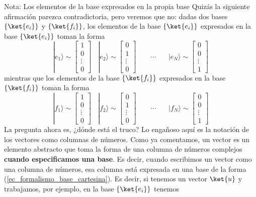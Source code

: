 \documentclass[a4paper,11pt]{book} %
\numberwithin{equation}{chapter}
\begin{document}
	\begin{mybox_blue}{Nota: Los elementos de la base expresados en la propia base}
	Quizás la siguiente afirmación parezca contradictoria, pero veremos que no: dadas dos bases $\{\ket{e_i}\}$ y $\{\ket{f_i}\}$, los elementos de la base $\{\ket{e_i}\}$ expresados en la base $\{\ket{e_i}\}$ toman la forma
		\begin{equation*}
|e_1\rangle \sim \begin{bmatrix} 1 \\ 0 \\ \vdots 
 \\ 0 \end{bmatrix}~~~~
|e_2\rangle \sim \begin{bmatrix} 0 \\ 1 \\  \vdots 
 \\ 0 \end{bmatrix}~~~~~~~~~
\cdots ~~~~~~~~
|e_N\rangle \sim \begin{bmatrix} 0 \\ 0 \\ \vdots 
 \\ 1 \end{bmatrix}
		\end{equation*}
	mientras que los elementos de la base $\{\ket{f_i}\}$ expresados en la base $\{\ket{f_i}\}$ toman la forma
		\begin{equation*}
|f_1\rangle \sim \begin{bmatrix} 1 \\ 0 \\  \vdots 
 \\ 0 \end{bmatrix}~~~~
|f_2\rangle \sim \begin{bmatrix} 0 \\ 1 \\ \vdots 
 \\ 0 \end{bmatrix}~~~~~~~~~
\cdots ~~~~~~~~
|f_N\rangle \sim \begin{bmatrix} 0 \\ 0 \\ \vdots 
 \\ 1 \end{bmatrix}
		\end{equation*}
	La pregunta ahora es, ¿dónde está el truco? Lo engañoso aquí es la notación de los vectores como columnas de números. Como ya comentamos, un vector es un elemento abstracto que toma la forma de una columna de números complejos \textbf{cuando especificamos una base}. Es decir, cuando escribimos un vector como una columna de números, esa columna está expresada en una base de la forma (\ref{ec_formalismo_base_cartesina}). Es decir, si tenemos un vector $\ket{u}$ y trabajamos, por ejemplo, en la base $\{\ket{e_i}\}$ tenemos

\end{mybox_blue}
\end{document}
